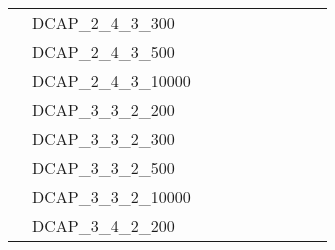 \begin{table}[]
{\begin{tabular}{|c|l|ll|ll|ll|l|l|}
			& DCAP\_2\_4\_3\_300            &                                   &                                  &                           &                          &                           &                          &                                       &                                \\
			& DCAP\_2\_4\_3\_500            &                                   &                                  &                           &                          &                           &                          &                                       &                                \\
			& DCAP\_2\_4\_3\_10000          &                                   &                                  &                           &                          &                           &                          &                                       &                                \\
			& DCAP\_3\_3\_2\_200            &                                   &                                  &                           &                          &                           &                          &                                       &                                \\
			& DCAP\_3\_3\_2\_300            &                                   &                                  &                           &                          &                           &                          &                                       &                                \\
			& DCAP\_3\_3\_2\_500            &                                   &                                  &                           &                          &                           &                          &                                       &                                \\
			& DCAP\_3\_3\_2\_10000          &                                   &                                  &                           &                          &                           &                          &                                       &                                \\
			& DCAP\_3\_4\_2\_200            &                                   &                                  &                           &                          &                           &                          &                                       &                                \\

\end{tabular}}
\end{table}
